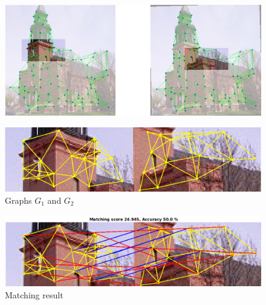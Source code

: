 \documentclass[
	fontsize=12pt,
	paper=a4,
	twoside=false,
	numbers=noenddot,
	plainheadsepline,
	toc=listof,
	toc=bibliography
]{scrartcl}
\begin{document}
\FloatBarrier
\newpage
\begin{figure} [htb] \centering
	\includegraphics[scale = 0.35]{test6/subregions.png}
\end{figure}
\begin{figure} [hb] \centering
	\includegraphics[scale = 0.4]{test6/subgraphs.png}
	\caption{Graphs $G_1$ and $G_2$}
\end{figure}
\begin{figure} [htb] \centering
	\includegraphics[scale = 0.4]{test6/matching_result.png}
	\caption{ Matching result}
\end{figure}

\FloatBarrier
\end{document}
